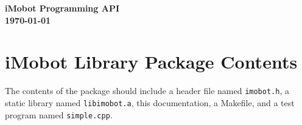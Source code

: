 \documentclass[11pt]{report}
\begin{document}
\thispagestyle{empty}
\begin{center}


\vspace{0.5in}
{\Huge\sf\bf iMobot Programming API} \\
\vspace{2.0in}
{\large\sf\bf\today}
\end{center}

\pagebreak

\begin{abstract} 
This library implements control functions for controlling an iMobot
robotic module.

\end{abstract}
\pagebreak

\setcounter{page}{1}
\tableofcontents
\pagebreak

\setcounter{page}{1}
\pagebreak


\chapter{iMobot Library Package Contents}
The contents of the package should include a header file named
\texttt{imobot.h}, a static library named \texttt{libimobot.a},
this documentation, a Makefile, and a test program named \texttt{simple.cpp}.
\end{document}
